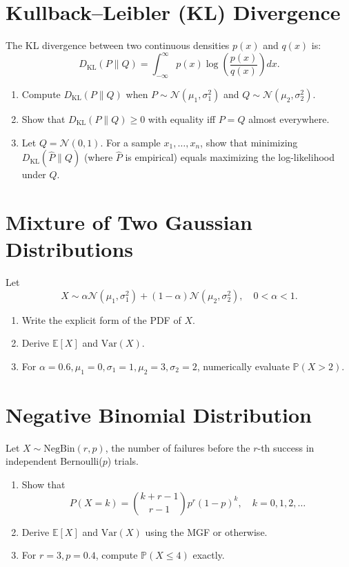 \documentclass[12pt,a4paper]{article}
\begin{document}
\section{Kullback–Leibler (KL) Divergence}
The KL divergence between two continuous densities \( p(x) \) and \( q(x) \) is:
\[
D_{\mathrm{KL}}(P\|Q) = \int_{-\infty}^{\infty} p(x)\log\!\left(\frac{p(x)}{q(x)}\right)dx.
\]
\begin{enumerate}[label=(\arabic*)]
\item Compute \( D_{\mathrm{KL}}(P\|Q) \) when \( P\sim \mathcal{N}(\mu_1,\sigma_1^2) \) and \( Q\sim \mathcal{N}(\mu_2,\sigma_2^2) \).
\item Show that \( D_{\mathrm{KL}}(P\|Q)\ge0 \) with equality iff \( P=Q \) almost everywhere.
\item Let \( Q=\mathcal{N}(0,1) \). For a sample \( x_1,\ldots,x_n \), show that minimizing \( D_{\mathrm{KL}}(\hat{P}\|Q) \) (where \( \hat{P} \) is empirical) equals maximizing the log-likelihood under \( Q \).
\end{enumerate}

\section{Mixture of Two Gaussian Distributions}
Let
\[
X \sim \alpha \mathcal{N}(\mu_1,\sigma_1^2) + (1-\alpha)\mathcal{N}(\mu_2,\sigma_2^2),
\quad 0<\alpha<1.
\]
\begin{enumerate}[label=(\arabic*)]
\item Write the explicit form of the PDF of \( X \).
\item Derive \( \mathbb{E}[X] \) and \( \mathrm{Var}(X) \).
\item For \( \alpha=0.6,\mu_1=0,\sigma_1=1,\mu_2=3,\sigma_2=2 \), numerically evaluate \( \mathbb{P}(X>2) \).
\end{enumerate}

\section{Negative Binomial Distribution}
Let \( X\sim\mathrm{NegBin}(r,p) \), the number of failures before the \(r\)-th success in independent Bernoulli(\(p\)) trials.
\begin{enumerate}[label=(\arabic*)]
\item Show that
\[
P(X=k)=\binom{k+r-1}{r-1}p^r(1-p)^k,\quad k=0,1,2,\ldots
\]
\item Derive \( \mathbb{E}[X] \) and \( \mathrm{Var}(X) \) using the MGF or otherwise.
\item For \( r=3,p=0.4 \), compute \( \mathbb{P}(X\le4) \) exactly.
\end{enumerate}
\end{document}
